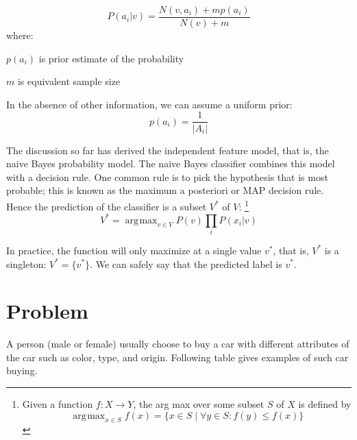 \documentclass[a4paper]{article}
\DeclareMathOperator*{\argmax}{\arg\!\max}
\begin{document}
		\begin{equation}
			\label{eq:probattr}
			P(a_i | v) = \frac{N(v,a_i) + m p(a_i)}{N(v) + m}
		\end{equation}
		where:
		\begin{description}
			\item $p(a_i)$ is prior estimate of the probability
			\item $m$ is equivalent sample size
		\end{description}

		In the absence of other information, we can assume a uniform prior:
		\begin{equation}
			\label{eq:priori}
			p(a_i) = \frac{1}{|A_i|}
		\end{equation}

		The discussion so far has derived the independent feature model, that is,
		the naive Bayes probability model. The naive Bayes classifier combines this
		model with a decision rule. One common rule is to pick the hypothesis that
		is most probable; this is known as the maximum a posteriori or MAP decision
		rule. Hence the prediction of the classifier is a subset $V^*$ of $V$:
		\footnote{
			Given a function $f: X \to Y$, the arg max over some subset $S$ of $X$ is
			defined by
			\[\argmax_{x \in S}{f(x)} = \{x \in S \mid \forall y \in S: f(y) \leq f(x)\}\]
		}
		\begin{equation}
			\label{eq:predict}
			V^* = \argmax_{v \in V} P(v) \prod_i{P(x_i | v)}
		\end{equation}

		In practice, the function will only maximize at a single value $v^*$, that
		is, $V^*$ is a singleton: $V^* = \{v^*\}$. We can safely say that the predicted label is
		$v^*$.

\section{Problem}
		A person (male or female) usually choose to buy a car with different
		attributes of the car such as color, type, and origin. Following
		table gives examples of such car buying.
\end{document}
